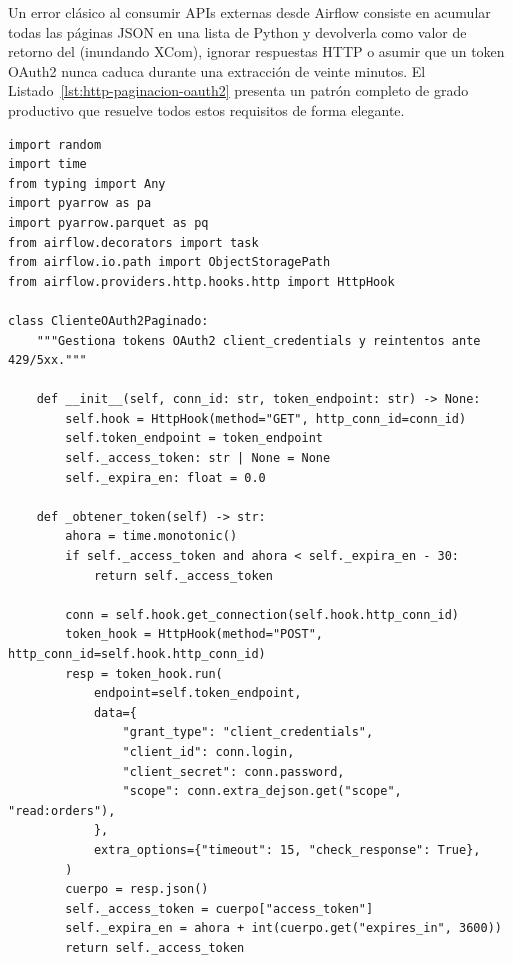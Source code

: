 Un error clásico al consumir APIs externas desde Airflow consiste en acumular todas las páginas JSON en una lista de Python y devolverla como valor de retorno del  (inundando XCom), ignorar respuestas HTTP  o asumir que un token OAuth2 nunca caduca durante una extracción de veinte minutos. El Listado~\ref{lst:http-paginacion-oauth2} presenta un patrón completo de grado productivo que resuelve todos estos requisitos de forma elegante.

\begin{lstlisting}[style=python, caption={Extracción paginada (cursor-based) con OAuth2 renovable, control de \texttt{Retry-After} y escritura directa a Parquet.}, label={lst:http-paginacion-oauth2}]
import random
import time
from typing import Any
import pyarrow as pa
import pyarrow.parquet as pq
from airflow.decorators import task
from airflow.io.path import ObjectStoragePath
from airflow.providers.http.hooks.http import HttpHook

class ClienteOAuth2Paginado:
    """Gestiona tokens OAuth2 client_credentials y reintentos ante 429/5xx."""

    def __init__(self, conn_id: str, token_endpoint: str) -> None:
        self.hook = HttpHook(method="GET", http_conn_id=conn_id)
        self.token_endpoint = token_endpoint
        self._access_token: str | None = None
        self._expira_en: float = 0.0

    def _obtener_token(self) -> str:
        ahora = time.monotonic()
        if self._access_token and ahora < self._expira_en - 30:
            return self._access_token

        conn = self.hook.get_connection(self.hook.http_conn_id)
        token_hook = HttpHook(method="POST", http_conn_id=self.hook.http_conn_id)
        resp = token_hook.run(
            endpoint=self.token_endpoint,
            data={
                "grant_type": "client_credentials",
                "client_id": conn.login,
                "client_secret": conn.password,
                "scope": conn.extra_dejson.get("scope", "read:orders"),
            },
            extra_options={"timeout": 15, "check_response": True},
        )
        cuerpo = resp.json()
        self._access_token = cuerpo["access_token"]
        self._expira_en = ahora + int(cuerpo.get("expires_in", 3600))
        return self._access_token


\end{lstlisting}
